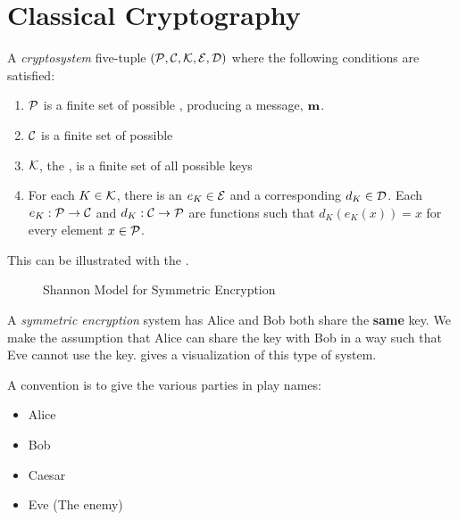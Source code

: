 \section{Classical Cryptography}\label{sec:Classical_Cryptography}
\begin{definition}[Cryptosystem]\label{def:Cryptosystem}
  A \emph{cryptosystem} five-tuple $(\operatorname{\mathcal{P}}, \operatorname{\mathcal{C}}, \operatorname{\mathcal{K}}, \operatorname{\mathcal{E}}, \operatorname{\mathcal{D}})$ where the following conditions are satisfied:
  \begin{enumerate}[noitemsep]
  \item $\operatorname{\mathcal{P}}$ is a finite set of possible \emph{}, producing a message, $\operatorname{\mathbf{m}}$.
  \item $\operatorname{\mathcal{C}}$ is a finite set of possible \emph{}
  \item $\operatorname{\mathcal{K}}$, the \emph{}, is a finite set of all possible keys
  \item For each $K \in \operatorname{\mathcal{K}}$, there is an \emph{} $e_{K}\in \operatorname{\mathcal{E}}$ and a corresponding \emph{} $d_{K} \in \operatorname{\mathcal{D}}$.
    Each $e_{K} : \operatorname{\mathcal{P}} \rightarrow \operatorname{\mathcal{C}}$ and $d_{K} : \operatorname{\mathcal{C}} \rightarrow \operatorname{\mathcal{P}}$ are functions such that $d_{K} \left( e_{K}(x) \right) = x$ for every  element $x \in \operatorname{\mathcal{P}}$.
  \end{enumerate}
\end{definition}

This can be illustrated with the .

\begin{figure}[h!]
  \centering
  \caption{Shannon Model for Symmetric Encryption}
  \label{fig:Shannon_Model_Symmetric_Encryption}
\end{figure}

\begin{definition}\label{def:Symmetric_Encryption}
  A \emph{symmetric encryption} system has Alice and Bob both share the \textbf{same} key.
  We make the assumption that Alice can share the key with Bob in a way such that Eve cannot use the key.
   gives a visualization of this type of system.
\end{definition}

A convention is to give the various parties in play names:
\begin{itemize}[noitemsep]
\item Alice
\item Bob
\item Caesar
\item Eve (The enemy)
\end{itemize}

